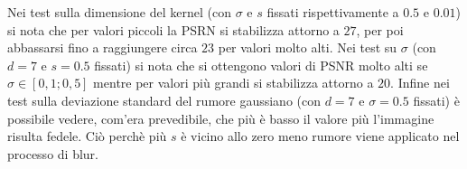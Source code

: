 \documentclass{article}
\begin{document}
\newpage %


Nei test sulla dimensione del kernel (con $\sigma$ e $s$ fissati rispettivamente a $0.5$ e
$0.01$) si nota che per valori piccoli la PSRN si stabilizza attorno a $27$, per poi
abbassarsi fino a raggiungere circa $23$ per valori molto alti.
Nei test su $\sigma$ (con $d = 7$ e $s=0.5$ fissati) si nota che si ottengono valori di
PSNR molto alti se $ \sigma \in [0,1;0,5]$ mentre per valori più grandi si stabilizza
attorno a $20$.
Infine nei test sulla deviazione standard del rumore gaussiano (con $d=7$ e $\sigma=0.5$
fissati) è possibile vedere, com'era prevedibile, che più è basso il valore più l'immagine
risulta fedele. Ciò perchè più $s$ è vicino allo zero meno rumore viene applicato nel
processo di blur.
\end{document}
